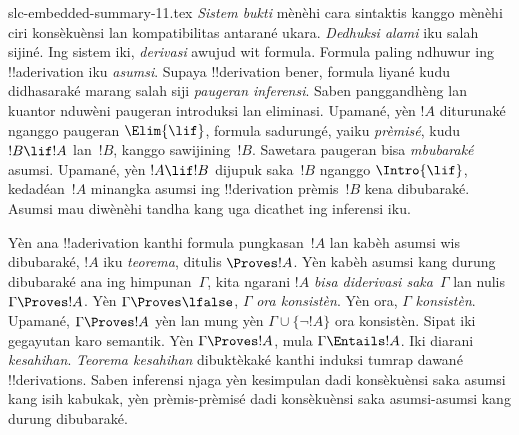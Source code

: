 \begin{filecontents*}[overwrite]{slc-embedded-summary-11.tex}
\emph{Sistem bukti} mènèhi cara sintaktis kanggo mènèhi ciri
konsèkuènsi lan kompatibilitas antarané ukara. \emph{Dedhuksi
alami} iku salah sijiné. Ing sistem iki, \emph{derivasi} awujud
wit formula. Formula paling ndhuwur ing !!a{derivation} iku
\emph{asumsi}. Supaya !!{derivation} bener, formula liyané
kudu didhasaraké marang salah siji \emph{paugeran
inferensi}. Saben panggandhèng lan kuantor nduwèni paugeran
introduksi lan eliminasi. Upamané, yèn $!A$ diturunaké nganggo
paugeran $\Elim{\lif}$, formula sadurungé, yaiku \emph{prèmisé},
kudu $!B\lif !A$ lan~$!B$, kanggo sawijining~$!B$.
Sawetara paugeran bisa \emph{mbubaraké} asumsi. Upamané, yèn
$!A\lif !B$ dijupuk saka~$!B$ nganggo $\Intro{\lif}$,
kedadéan~$!A$ minangka asumsi ing !!{derivation} prèmis~$!B$
kena dibubaraké. Asumsi mau diwènèhi tandha kang uga dicathet
ing inferensi iku.

Yèn ana !!a{derivation} kanthi formula pungkasan~$!A$ lan
kabèh asumsi wis dibubaraké, $!A$ iku \emph{teorema},
ditulis $\Proves !A$. Yèn kabèh asumsi kang durung dibubaraké
ana ing himpunan~$\Gamma$, kita ngarani $!A$ \emph{bisa diderivasi
saka}~$\Gamma$ lan nulis $\Gamma\Proves !A$. Yèn
$\Gamma\Proves\lfalse$, $\Gamma$ \emph{ora konsistèn}.
Yèn ora, $\Gamma$ \emph{konsistèn}. Upamané, $\Gamma\Proves !A$
yèn lan mung yèn $\Gamma\cup\{\lnot !A\}$ ora konsistèn.
Sipat iki gegayutan karo semantik. Yèn $\Gamma\Proves !A$,
mula $\Gamma\Entails !A$. Iki diarani \emph{kesahihan}.
\emph{Teorema kesahihan} dibuktèkaké kanthi induksi tumrap
dawané !!{derivation}s. Saben inferensi njaga yèn kesimpulan
dadi konsèkuènsi saka asumsi kang isih kabukak, yèn prèmis-prèmisé
dadi konsèkuènsi saka asumsi-asumsi kang durung dibubaraké.
\end{filecontents*}

